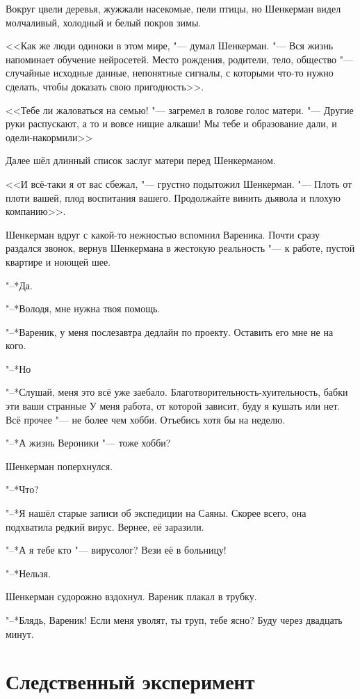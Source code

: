 Вокруг цвели деревья, жужжали насекомые, пели птицы, но Шенкерман видел молчаливый, холодный и белый покров зимы.

<<Как же люди одиноки в этом мире, "--- думал Шенкерман.
"--- Вся жизнь напоминает обучение нейросетей.
Место рождения, родители, тело, общество "--- случайные исходные данные, непонятные сигналы, с которыми что-то нужно сделать, чтобы доказать свою пригодность>>.

<<Тебе ли жаловаться на семью! "--- загремел в голове голос матери.
"--- Другие руки распускают, а то и вовсе нищие алкаши!
Мы тебе и образование дали, и одели-накормили\ldotse>>

Далее шёл длинный список заслуг матери перед Шенкерманом.

<<И всё-таки я от вас сбежал, "--- грустно подытожил Шенкерман.
"--- Плоть от плоти вашей, плод воспитания вашего.
Продолжайте винить дьявола и плохую компанию>>.

Шенкерман вдруг с какой-то нежностью вспомнил Вареника.
Почти сразу раздался звонок, вернув Шенкермана в жестокую реальность "--- к работе, пустой квартире и ноющей шее.

"--*Да.

"--*Володя, мне нужна твоя помощь.

"--*Вареник, у меня послезавтра дедлайн по проекту.
Оставить его мне не на кого.

"--*Но\ldotst

"--*Слушай, меня это всё уже заебало.
Благотворительность-хуительность, бабки эти ваши странные\ldotst
У меня работа, от которой зависит, буду я кушать или нет.
Всё прочее "--- не более чем хобби.
Отъебись хотя бы на неделю.

"--*А жизнь Вероники "--- тоже хобби?

Шенкерман поперхнулся.

"--*Что?

"--*Я нашёл старые записи об экспедиции на Саяны.
Скорее всего, она подхватила редкий вирус.
Вернее, её заразили.

"--*А я тебе кто "--- вирусолог?
Вези её в больницу!

"--*Нельзя.

Шенкерман судорожно вздохнул.
Вареник плакал в трубку.

"--*Блядь, Вареник!
Если меня уволят, ты труп, тебе ясно?
Буду через двадцать минут.

\section{Следственный эксперимент}

